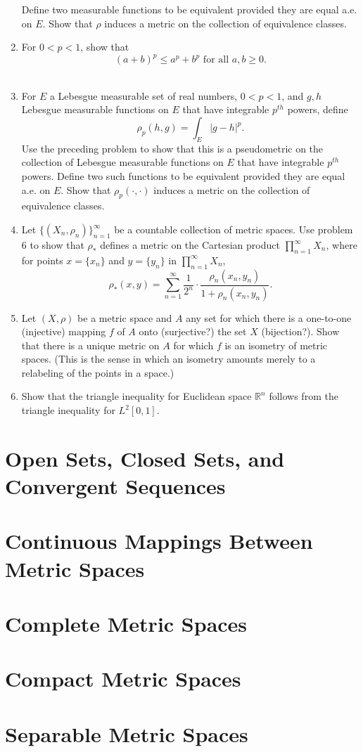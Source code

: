 \begin{enumerate}
    Define two measurable functions to be equivalent provided they are equal a.e. on $E$.
    Show that $\rho$ induces a metric on the collection of equivalence classes.
    \item For $0<p<1$, show that 
    \[
    (a+b)^p\le a^p+b^p\text{ for all }a,b\ge0.    
    \]\
    \item For $E$ a Lebesgue measurable set of real numbers, $0<p<1$, and $g,h$ Lebesgue measurable functions on $E$ that have integrable $p^{th}$ powers, define
    \[
    \rho_p(h,g)=\int_E|g-h|^p.    
    \]  
    Use the preceding problem to show that this is a pseudometric on the collection of Lebesgue measurable functions on $E$ that have integrable $p^{th}$ powers.
    Define two such functions to be equivalent provided they are equal a.e. on $E$. 
    Show that $\rho_p(\cdot,\cdot)$ induces a metric on the collection of equivalence classes.
    \item Let $\{(X_n,\rho_n)\}_{n=1}^\infty$ be a countable collection of metric spaces.
    Use problem 6 to show that $\rho_*$ defines a metric on the Cartesian product $\prod_{n=1}^\infty X_n$, where for points $x = \{x_n\}$ and $y= \{y_n\}$ in $\prod_{n=1}^\infty X_n$,
    \[
    \rho_*(x,y)=\sum_{n=1}^\infty\frac{1}{2^n}\cdot\frac{\rho_n(x_n,y_n)}{1+\rho_n(x_n,y_n)}.    
    \]
    \item Let $(X,\rho)$ be a metric space and $A$ any set for which there is a one-to-one (injective) mapping $f$ of $A$ onto (surjective?) the set $X$ (bijection?).
    Show that there is a unique metric on $A$ for which $f$ is an isometry of metric spaces.
    (This is the sense in which an isometry amounts merely to a relabeling of the points in a space.)
    \item Show that the triangle inequality for Euclidean space $\mathbb{R}^n$ follows from the triangle inequality for $L^2[0,1]$.
\end{enumerate}

\section{Open Sets, Closed Sets, and Convergent Sequences}

\section{Continuous Mappings Between Metric Spaces}

\section{Complete Metric Spaces}

\section{Compact Metric Spaces}

\section{Separable Metric Spaces}
